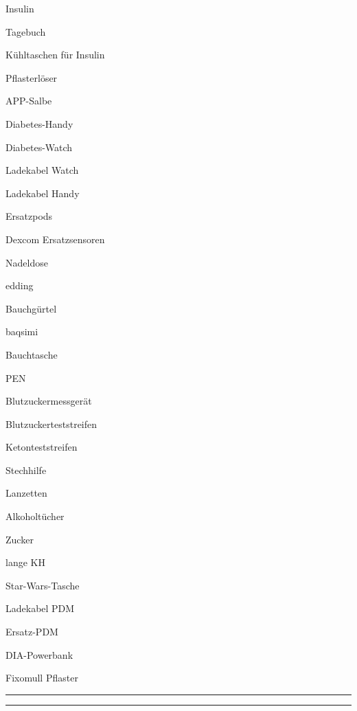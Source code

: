 \begin{ONEitemize}
    \item{Insulin}
    \item{Tagebuch}
    \item{Kühltaschen für Insulin}
    \item{Pflasterlöser}
    \item{APP-Salbe}
    \item{Diabetes-Handy}
    \item{Diabetes-Watch}
    \item{Ladekabel Watch}
    \item{Ladekabel Handy}
    \item{Ersatzpods}
    \item{Dexcom Ersatzsensoren}
    \item{Nadeldose}
    \item{edding}
    \item{Bauchgürtel}
    \item{baqsimi}
    \item{Bauchtasche}
    \item{PEN}
    \item{Blutzuckermessgerät}
    \item{Blutzuckerteststreifen}
    \item{Ketonteststreifen}
    \item{Stechhilfe}
    \item{Lanzetten}
    \item{Alkoholtücher}
    \item{Zucker}
    \item{lange KH}
    \item{Star-Wars-Tasche}
    \item{Ladekabel PDM}
    \item{Ersatz-PDM}
    \item{DIA-Powerbank}
    \item{Fixomull Pflaster}
    \item{\rule{50mm}{0.4pt}}
    \item{\rule{50mm}{0.4pt}}
\end{ONEitemize}
